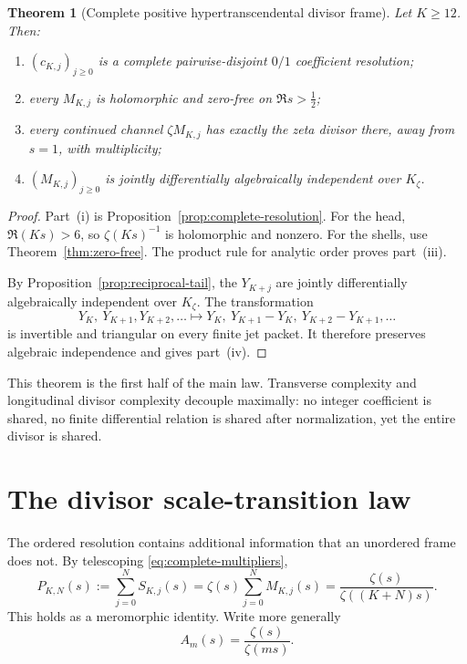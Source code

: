 \documentclass[11pt]{article}
\newtheorem{theorem}{Theorem}[section]
\theoremstyle{definition}
\theoremstyle{remark}
\begin{document}
\begin{theorem}[Complete positive hypertranscendental divisor frame]
\label{thm:complete-frame}
Let \(K\geq12\).  Then:
\begin{enumerate}[label=\textup{(\roman*)}]
\item \((c_{K,j})_{j\geq0}\) is a complete pairwise-disjoint \(0/1\) coefficient resolution;
\item every \(M_{K,j}\) is holomorphic and zero-free on \(\Re s>\tfrac12\);
\item every continued channel \(\zeta M_{K,j}\) has exactly the zeta divisor there, away from
\(s=1\), with multiplicity;
\item \((M_{K,j})_{j\geq0}\) is jointly differentially algebraically independent over
\(K_\zeta\).
\end{enumerate}
\end{theorem}

\begin{proof}
Part~\textup{(i)} is Proposition~\ref{prop:complete-resolution}.  For the head,
\(\Re(Ks)>6\), so \(\zeta(Ks)^{-1}\) is holomorphic and nonzero.  For the shells, use
Theorem~\ref{thm:zero-free}.  The product rule for analytic order proves
part~\textup{(iii)}.

By Proposition~\ref{prop:reciprocal-tail}, the \(Y_{K+j}\) are jointly differentially
algebraically independent over \(K_\zeta\).  The transformation
\[
 Y_K,\ Y_{K+1},Y_{K+2},\ldots
 \longmapsto
 Y_K,\ Y_{K+1}-Y_K,\ Y_{K+2}-Y_{K+1},\ldots
 \tag{6.7}
\]
is invertible and triangular on every finite jet packet.  It therefore preserves algebraic
independence and gives part~\textup{(iv)}.
\end{proof}

This theorem is the first half of the main law.  Transverse complexity and longitudinal divisor
complexity decouple maximally: no integer coefficient is shared, no finite differential
relation is shared after normalization, yet the entire divisor is shared.

\section{The divisor scale-transition law}\label{sec:scale-transition}

The ordered resolution contains additional information that an unordered frame does not.  By
telescoping \eqref{eq:complete-multipliers},
\begin{equation}
 P_{K,N}(s):=\sum_{j=0}^{N}S_{K,j}(s)
 =\zeta(s)\sum_{j=0}^{N}M_{K,j}(s)
 =\frac{\zeta(s)}{\zeta((K+N)s)}.
 \label{eq:prefix-transition}
\end{equation}
This holds as a meromorphic identity.  Write more generally
\[
 A_m(s)=\frac{\zeta(s)}{\zeta(ms)}.
 \tag{7.2}
\]
\end{document}
